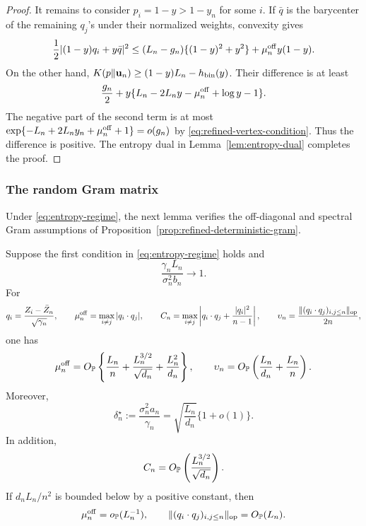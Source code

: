 \begin{proof}
It remains to consider \(p_i=1-y>1-y_n\) for some \(i\).  If \(\bar q\)
is the barycenter of the remaining \(q_j\)'s under their normalized
weights, convexity gives
\[
 \frac12|(1-y)q_i+y\bar q|^2
 \le(L_n-g_n)\{(1-y)^2+y^2\}+\mu_n^{\rm off}y(1-y).
\]
On the other hand,
\(K(p\Vert \mathbf u_n)\ge(1-y)L_n-h_{\rm bin}(y)\). Their difference is at least
\[
 \frac{g_n}{2}
 +y\{L_n-2L_ny-\mu_n^{\rm off}+\log y-1\}.
\]
The negative part of the second term is at most
\(\exp\{-L_n+2L_ny_n+\mu_n^{\rm off}+1\}=o(g_n)\) by
\eqref{eq:refined-vertex-condition}.  Thus the difference is positive.
The entropy dual in Lemma~\ref{lem:entropy-dual} completes the proof.
\end{proof}

\subsubsection{The random Gram matrix}

Under \eqref{eq:entropy-regime}, the next lemma verifies the off-diagonal and
spectral Gram assumptions of
Proposition~\ref{prop:refined-deterministic-gram}.

\begin{lemma}
\label{lem:random-off-diagonal}
Suppose the first condition in \eqref{eq:entropy-regime} holds and
\[
 \frac{\gamma_nL_n}{\sigma_n^2b_n}\longrightarrow1.
\]
For
\[
  q_i=\frac{Z_i-\bar Z_n}{\sqrt{\gamma_n}},
  \qquad
  \mu_n^{\rm off}=\max_{i\ne j}|q_i\cdot q_j|,
  \qquad
  C_n=\max_{i\ne j}
  \left|q_i\cdot q_j+\frac{|q_i|^2}{n-1}\right|,
  \qquad
  \upsilon_n=\frac{\|(q_i\cdot q_j)_{i,j\le n}\|_{\rm op}}{2n},
\]
one has
\begin{equation}
\label{eq:B-rate}
  \mu_n^{\rm off}
  =
  O_{\mathbb P}\left\{
    \frac{L_n}{n}
    +\frac{L_n^{3/2}}{\sqrt{d_n}}
    +\frac{L_n^2}{d_n}
  \right\},
  \qquad
  \upsilon_n
  =
  O_{\mathbb P}\left(\frac{L_n}{d_n}+\frac{L_n}{n}\right).
\end{equation}
Moreover,
\begin{equation}
\label{eq:delta-entropy-regime}
  \delta_n^\star:=\frac{\sigma_n^2a_n}{\gamma_n}
  =
  \sqrt{\frac{L_n}{d_n}}\{1+o(1)\}.
\end{equation}
In addition,
\begin{equation}
\label{eq:centered-row-gram-rate}
 C_n=O_{\mathbb P}\left(\frac{L_n^{3/2}}{\sqrt{d_n}}\right).
\end{equation}
If \(d_nL_n/n^2\) is bounded below by a positive constant, then
\begin{equation}
\label{eq:high-simplex-gram-rates}
 \mu_n^{\rm off}=o_{\mathbb P}(L_n^{-1}),
 \qquad
 \|(q_i\cdot q_j)_{i,j\le n}\|_{\rm op}=O_{\mathbb P}(L_n).
\end{equation}
\end{lemma}

